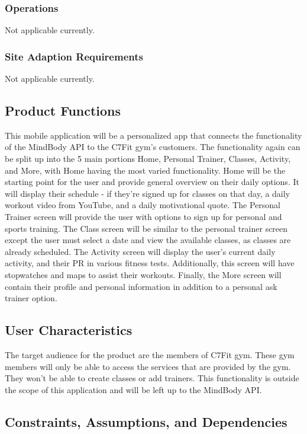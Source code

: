 \documentclass[letterpaper,10pt,titlepage]{article}
\begin{document}
\subsubsection{Operations}

Not applicable currently.

\subsubsection{Site Adaption Requirements}

Not applicable currently.

\subsection{Product Functions}

This mobile application will be a personalized app that connects the functionality of the MindBody API to the C7Fit gym's customers. The functionality again can be split up into the 5 main portions Home, Personal Trainer, Classes, Activity, and More, with Home having the most varied functionality. Home will be the starting point for the user and provide general overview on their daily options. It will display their schedule - if they're signed up for classes on that day, a daily workout video from YouTube, and a daily motivational quote. The Personal Trainer screen will provide the user with options to sign up for personal and sports training. The Class screen will be similar to the personal trainer screen except the user must select a date and view the available classes, as classes are already scheduled. The Activity screen will display the user's current daily activity, and their PR in various fitness tests. Additionally, this screen will have stopwatches and maps to assist their workouts. Finally, the More screen will contain their profile and personal information in addition to a personal ask trainer option.

\subsection{User Characteristics}

The target audience for the product are the members of C7Fit gym. These gym members will only be able to access the services that are provided by the gym. They won't be able to create classes or add trainers. This functionality is outside the scope of this application and will be left up to the MindBody API.

\subsection{Constraints, Assumptions, and Dependencies}
\end{document}
